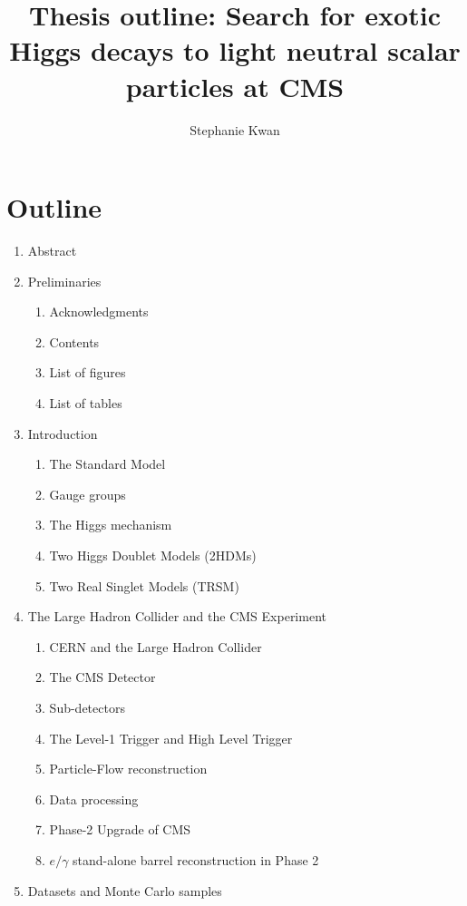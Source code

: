 \documentclass{article}
\title{Thesis outline: Search for exotic Higgs decays to light neutral scalar particles at CMS}
\author{Stephanie Kwan}
\begin{document}
\maketitle

\section{Outline}

\begin{enumerate}
    \item Abstract
    \item Preliminaries
        \begin{enumerate}
            \item Acknowledgments
            \item Contents
            \item List of figures
            \item List of tables
        \end{enumerate}
    \item Introduction
        \begin{enumerate}
            \item The Standard Model
            \item Gauge groups
            \item The Higgs mechanism
            \item Two Higgs Doublet Models (2HDMs)
            \item Two Real Singlet Models (TRSM)
        \end{enumerate}
    \item The Large Hadron Collider and the CMS Experiment
        \begin{enumerate}
            \item CERN and the Large Hadron Collider
            \item The CMS Detector
            \item Sub-detectors
            \item The Level-1 Trigger and High Level Trigger
            \item Particle-Flow reconstruction
            \item Data processing 
            \item Phase-2 Upgrade of CMS
            \item $e/\gamma$ stand-alone barrel reconstruction in Phase 2
        \end{enumerate}
    \item Datasets and Monte Carlo samples

\end{enumerate}
\end{document}

